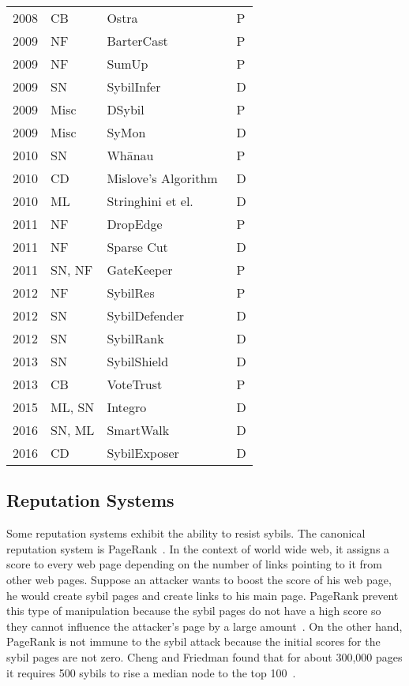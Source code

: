 \begin{table}[]
\begin{tabular}{llll}
  2008 & CB     & Ostra~\cite{mislove2008ostra} & P  \\
  2009 & NF     & BarterCast~\cite{meulpolder2009bartercast} & P  \\
  2009 & NF     & SumUp~\cite{tran2009sybil} & P  \\
  2009 & SN     & SybilInfer~\cite{danezis2009sybilinfer} & D  \\
  2009 & Misc   & DSybil~\cite{yu2009dsybil} & P  \\
  2009 & Misc   & SyMon~\cite{jyothi2009symon} & D  \\
  2010 & SN     & Wh\={a}nau~\cite{lesniewski2010whanau} & P  \\
  2010 & CD     & Mislove's Algorithm~\cite{viswanath2010analysis} & D  \\
  2010 & ML     & Stringhini et el.~\cite{stringhini2010detecting} & D  \\
  2011 & NF     & DropEdge~\cite{seuken2011sybil} & P  \\
  2011 & NF     & Sparse Cut~\cite{kurve2011sybil} & D  \\
  2011 & SN, NF & GateKeeper~\cite{tran2011optimal} & P  \\
  2012 & NF     & SybilRes~\cite{delaviz2012sybilres} & P  \\
  2012 & SN     & SybilDefender~\cite{wei2012sybildefender} & D  \\
  2012 & SN     & SybilRank~\cite{cao2012aiding} & D  \\
  2013 & SN     & SybilShield~\cite{shi2013sybilshield} & D  \\
  2013 & CB     & VoteTrust~\cite{xue2013votetrust} & P  \\
  2015 & ML, SN & Integro~\cite{boshmaf2015integro} & D  \\
  2016 & SN, ML & SmartWalk~\cite{liu2016smartwalk} & D  \\
  2016 & CD     & SybilExposer~\cite{misra2016sybilexposer} & D
\end{tabular}
\end{table}

\subsection{Reputation Systems}
Some reputation systems exhibit the ability to resist sybils. The canonical
reputation system is PageRank~\cite{page1999pagerank}. In the context of world
wide web, it assigns a score to every web page depending on the number of links
pointing to it from other web pages. Suppose an attacker wants to boost the
score of his web page, he would create sybil pages and create links to his main
page. PageRank prevent this type of manipulation because the sybil pages do not
have a high score so they cannot influence the attacker's page by a large
amount~\cite{baeza2005pagerank}. On the other hand, PageRank is not immune to
the sybil attack because the initial scores for the sybil pages are not zero.
Cheng and Friedman found that for about 300,000 pages it requires 500 sybils to
rise a median node to the top 100~\cite{cheng2006manipulability}.


